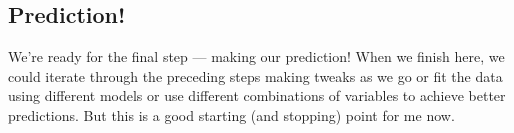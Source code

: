 \documentclass[]{book}
\newenvironment{Shaded}{\begin{snugshade}}{\end{snugshade}}
\newcommand{\KeywordTok}[1]{\textcolor[rgb]{0.13,0.29,0.53}{\textbf{#1}}}
\newcommand{\DataTypeTok}[1]{\textcolor[rgb]{0.13,0.29,0.53}{#1}}
\newcommand{\StringTok}[1]{\textcolor[rgb]{0.31,0.60,0.02}{#1}}
\newcommand{\CommentTok}[1]{\textcolor[rgb]{0.56,0.35,0.01}{\textit{#1}}}
\newcommand{\OperatorTok}[1]{\textcolor[rgb]{0.81,0.36,0.00}{\textbf{#1}}}
\newcommand{\NormalTok}[1]{#1}
\theoremstyle{definition}
\theoremstyle{definition}
\theoremstyle{definition}
\theoremstyle{remark}
\begin{document}
\subsection{Prediction!}\label{prediction-1}

We're ready for the final step --- making our prediction! When we finish
here, we could iterate through the preceding steps making tweaks as we
go or fit the data using different models or use different combinations
of variables to achieve better predictions. But this is a good starting
(and stopping) point for me now.

\begin{Shaded}
\end{Shaded}


\end{document}
